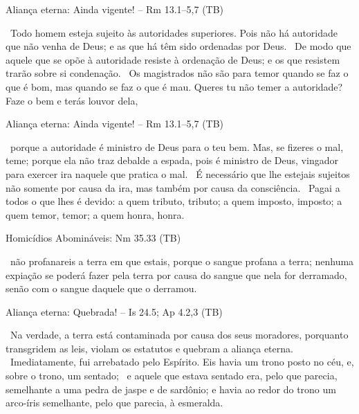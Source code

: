 \documentclass[12pt,aspectratio=169]{beamer}
\newcommand{\ver}[1]{%
    \raisebox{0.50ex}{%
        \scalebox{1.1}{%
            \pmb{\textbf{\textcolor{BSpbg}{#1}}}%
        }%
    }%
}
\newcommand{\QUOTE}[1]{%
    \par\noindent\hspace*{0.05\linewidth}%
    \begin{minipage}{0.9\linewidth}%
        \linespread{1.35}\large{#1}%
    \end{minipage}%
}
\newcommand{\RED}[1]{{\textcolor{TXred}{#1}}}
\newcommand{\YEL}[1]{{\textcolor{TXyel}{#1}}}
\newcommand{\GRE}[1]{{\textcolor{TXgre}{#1}}}
\newcommand{\MAG}[1]{{\textcolor{TXmag}{#1}}}
\newcommand{\BRI}[1]{{\textcolor{BSpbg}{#1}}}   %
\begin{document}
    \begin{frame}{Aliança eterna: \BRI{Ainda vigente!} -- Rm 13.1--5,7 (TB)}
        \QUOTE{%
            \ver{1}~Todo homem esteja \YEL{sujeito} às autoridades superiores. Pois \YEL{não há
            autoridade que não venha de Deus}; e as que há têm sido \YEL{ordenadas por Deus}.
            \ver{2}~De modo que aquele que se \RED{opõe} à autoridade \RED{resiste à ordenação
            de Deus}; e os que resistem trarão sobre si \RED{condenação}.
            \ver{3}~Os magistrados não são para temor quando se faz o que é bom, mas quando se
            faz o que é mau. Queres tu não temer a autoridade? \YEL{Faze o bem} e terás louvor
            dela,
        }
    \end{frame}

    \begin{frame}{Aliança eterna: \BRI{Ainda vigente!} -- Rm 13.1--5,7 (TB)}
        \QUOTE{%
            \ver{4}~porque a autoridade é \YEL{ministro de Deus} para o teu bem. Mas, se fizeres
            o mal, teme; porque ela não traz debalde a \MAG{espada}, pois é \MAG{ministro de
            Deus, vingador} para exercer ira naquele que pratica o mal.
            \ver{5}~É necessário que \YEL{lhe estejais sujeitos} não somente por causa da ira,
            mas também por causa da \YEL{consciência}.
            \ver{7}~\YEL{Pagai a todos o que lhes é devido}: a quem tributo, \GRE{tributo}; a
            quem imposto, \GRE{imposto}; a quem temor, \GRE{temor}; a quem honra, \GRE{honra}.
        }
    \end{frame}

    \begin{frame}{\BRI{Homicídios Abomináveis}: Nm 35.33 (TB)}
        \QUOTE{%
            \ver{33}~\RED{não profanareis a terra} em que estais, porque \RED{o sangue profana a
            terra}; \YEL{nenhuma expiação} se poderá fazer \YEL{pela terra} por causa do
            \RED{sangue} que \RED{nela} for \RED{derramado}, senão com o \MAG{sangue daquele que
            o derramou}.
        }
    \end{frame}

    \begin{frame}{Aliança eterna: \BRI{Quebrada!} -- Is 24.5; Ap 4.2,3 (TB)}
        \QUOTE{%
            \ver{Is 24.5}~Na verdade, a terra está contaminada por causa dos seus moradores,
            porquanto transgridem as leis, violam os estatutos e \YEL{quebram a aliança eterna}.
            \ver{Ap 4.2}~Imediatamente, fui arrebatado pelo Espírito. Eis havia um \YEL{trono
            posto no céu}, e, sobre o trono, um sentado;
            \ver{Ap 4.3}~e aquele que estava sentado era, pelo que parecia, semelhante a uma
            pedra de jaspe e de sardônio; e \YEL{havia ao redor do trono um arco-íris}
            semelhante, pelo que parecia, à \GRE{esmeralda}.
        }
    \end{frame}
\end{document}
